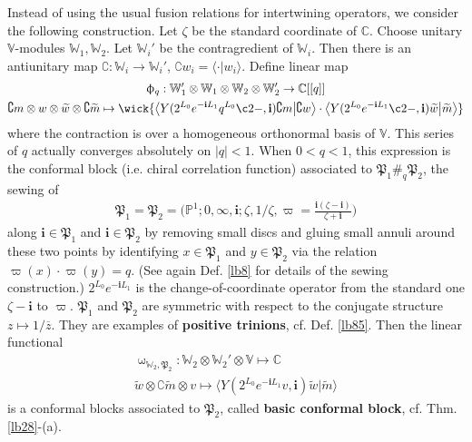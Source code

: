 \documentclass[11pt,b5paper,notitlepage]{article}
\theoremstyle{definition}
\theoremstyle{plain}
\newcommand{\fk}{\mathfrak}
\newcommand{\wtd}{\widetilde}
\newcommand{\ovl}{\overline}
\newcommand{\bk}[1]{\langle {#1}\rangle}
\newcommand{\bigbk}[1]{\big\langle {#1}\big\rangle}
\newcommand{\im}{\mathbf{i}}
\newcommand{\Co}{\complement}
\newcommand{\Vbb}{\mathbb V}
\newcommand{\Wbb}{\mathbb W}
\newcommand{\Cbb}{\mathbb C}
\newcommand{\Pbb}{\mathbb P}
\numberwithin{equation}{section}
\begin{document}
Instead of using the usual fusion relations for intertwining operators, we consider the following construction. Let $\zeta$ be the standard coordinate of $\Cbb$. Choose unitary $\Vbb$-modules $\Wbb_1,\Wbb_2$. Let $\Wbb_i'$ be the contragredient of $\Wbb_i$. Then there is an antiunitary map  $\Co:\Wbb_i\rightarrow\Wbb_i'$, $\Co w_i=\bk{\cdot|w_i}$. Define linear map 
\begin{gather*}
\upphi_q:\Wbb_1'\otimes\Wbb_1\otimes\Wbb_2\otimes\Wbb_2'\rightarrow\Cbb[[q]]\\
\Co m\otimes w\otimes \wtd w\otimes\Co\wtd m\mapsto \wick{\big\langle Y(2^{L_0}e^{-\im L_1}q^{L_0} \c2-,\im)\Co m\big|\Co w\big\rangle\cdot\big\langle Y(2^{L_0}e^{-\im L_1} \c2-,\im)\wtd w\big|\wtd m  \big\rangle  }
\end{gather*}
where the contraction is over a homogeneous orthonormal basis of $\Vbb$. This series of $q$ actually converges absolutely on $|q|<1$. When $0<q<1$, this expression is the conformal block (i.e. chiral correlation function) associated to $\fk P_1\#_q\fk P_2$, the sewing of
\begin{align*}
\fk P_1=\fk P_2=\Big(\Pbb^1;0,\infty,\im;\zeta,1/\zeta,\varpi=\frac{\im(\zeta-\im)}{\zeta+\im}\Big)
\end{align*}
along $\im\in \fk P_1$ and $\im\in\fk P_2$ by removing small discs and gluing small annuli around these two points by identifying $x\in\fk P_1$ and $y\in\fk P_2$ via the relation $\varpi(x)\cdot\varpi(y)=q$. (See again Def. \ref{lb8} for details of the sewing construction.) $2^{L_0}e^{-\im L_1}$ is the change-of-coordinate operator from the standard one $\zeta-\im$ to $\varpi$. $\fk P_1$ and $\fk P_2$ are symmetric with respect to the conjugate structure $z\mapsto 1/\ovl z$. They are examples of \textbf{positive trinions}, cf. Def. \ref{lb85}. Then the linear functional
\begin{gather*}
\upomega_{\Wbb_2,\fk P_2}:\Wbb_2\otimes\Wbb_2'\otimes \Vbb\mapsto \Cbb\\
\wtd w\otimes\Co\wtd m\otimes v\mapsto \bigbk{Y(2^{L_0}e^{-\im L_1}v,\im)\wtd w|\wtd m}
\end{gather*}
is a conformal blocks associated to $\fk P_2$, called \textbf{basic conformal block}, cf. Thm. \ref{lb28}-(a).
\end{document}
